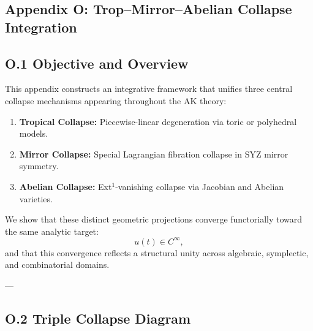 \documentclass[11pt]{article}
\begin{document}
\begin{axiom}
\begin{axiom}
{{\section*{Appendix O: Trop--Mirror--Abelian Collapse Integration}

\subsection*{O.1 Objective and Overview}

This appendix constructs an integrative framework that unifies three central collapse mechanisms  
appearing throughout the AK theory:

\begin{enumerate}
  \item \textbf{Tropical Collapse:} Piecewise-linear degeneration via toric or polyhedral models.
  \item \textbf{Mirror Collapse:} Special Lagrangian fibration collapse in SYZ mirror symmetry.
  \item \textbf{Abelian Collapse:} Ext$^1$-vanishing collapse via Jacobian and Abelian varieties.
\end{enumerate}

We show that these distinct geometric projections converge functorially toward the same analytic target:
\[
u(t) \in C^\infty,
\]
and that this convergence reflects a structural unity across algebraic, symplectic, and combinatorial domains.

---

\subsection*{O.2 Triple Collapse Diagram}

\noindent
\begin{minipage}{\textwidth}
\centering
{}
\vspace{0.5em}


\end{minipage}}}
\end{axiom}
\end{axiom}
\end{document}
